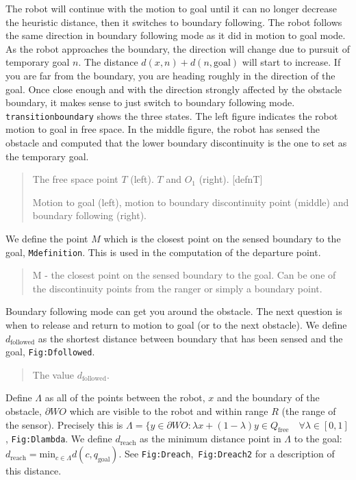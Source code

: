 The robot will continue with the motion to goal until it can no longer
decrease the heuristic distance, then it switches to boundary following.
The robot follows the same direction in boundary following mode as it
did in motion to goal mode. As the robot approaches the boundary, the
direction will change due to pursuit of temporary goal \(n\). The
distance \(d(x,n)+d(n,\text{goal})\) will start to increase. If you are
far from the boundary, you are heading roughly in the direction of the
goal. Once close enough and with the direction strongly affected by the
obstacle boundary, it makes sense to just switch to boundary following
mode. \texttt{transitionboundary} shows the three states. The left
figure indicates the robot motion to goal in free space. In the middle
figure, the robot has sensed the obstacle and computed that the lower
boundary discontinuity is the one to set as the temporary goal.

\begin{quote}
The free space point \(T\) (left). \(T\) and \(O_1\) (right).
{[}defnT{]}

Motion to goal (left), motion to boundary discontinuity point (middle)
and boundary following (right).
\end{quote}

We define the point \(M\) which is the closest point on the sensed
boundary to the goal, \texttt{Mdefinition}. This is used in the
computation of the departure point.

\begin{quote}
M - the closest point on the sensed boundary to the goal. Can be one of
the discontinuity points from the ranger or simply a boundary point.
\end{quote}

Boundary following mode can get you around the obstacle. The next
question is when to release and return to motion to goal (or to the next
obstacle). We define \(d_{\text{followed}}\) as the shortest distance
between boundary that has been sensed and the goal,
\texttt{Fig:Dfollowed}.

\begin{quote}
The value \(d_{\text{followed}}\).
\end{quote}

Define \(\Lambda\) as all of the points between the robot, \(x\) and the
boundary of the obstacle, \(\partial WO\) which are visible to the robot
and within range \(R\) (the range of the sensor). Precisely this is
\(\Lambda = \{ y \in \partial WO: \lambda x + (1-\lambda )y \in Q_{\mbox{free}} \quad \forall \lambda \in [0,1]\),
\texttt{Fig:Dlambda}. We define \(d_{\text{reach}}\) as the minimum
distance point in \(\Lambda\) to the goal:
\(d_{\mbox{reach}} = \mbox{min}_{c\in\Lambda} d(c,q_{\mbox{goal}})\).
See \texttt{Fig:Dreach},~\texttt{Fig:Dreach2} for a description of this
distance.

